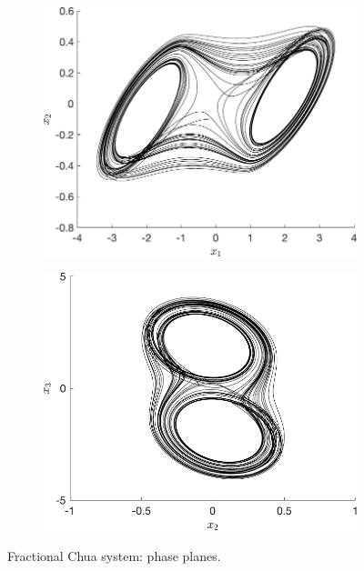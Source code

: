 \begin{figure}[H]
\centering
\begin{subfigure}[ht]{0.45\textwidth}
\includegraphics[scale=0.4]{files/ChuaX2vsX1_q0-95.pdf}
\end{subfigure}
\begin{subfigure}[ht]{0.45\textwidth}
\includegraphics[scale=0.4]{files/ChuaX2vsX3_q0-95.pdf}
\end{subfigure}
\caption{Fractional Chua system: phase planes.}
\label{fig:Exchua}
\end{figure}

